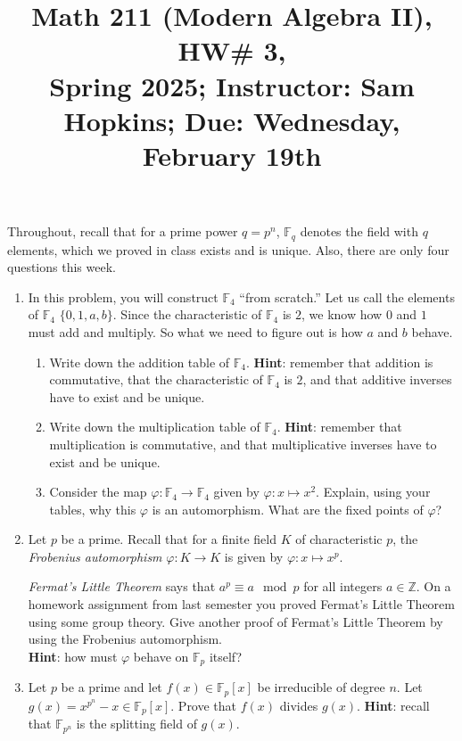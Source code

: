 \documentclass[11pt]{article}
\title{Math 211 (Modern Algebra II), HW\# 3, \\ {\normalsize Spring 2025; Instructor: Sam Hopkins; Due: Wednesday, February 19th}}
\date{}
\begin{document}
\maketitle

\thispagestyle{empty}

Throughout, recall that for a prime power $q=p^n$, $\mathbb{F}_q$ denotes the field with $q$ elements, which we proved in class exists and is unique. Also, there are only four questions this week.

\begin{enumerate}

\item In this problem, you will construct $\mathbb{F}_4$ ``from scratch.'' Let us call the elements of $\mathbb{F}_4$ $\{0,1,a,b\}$. Since the characteristic of $\mathbb{F}_4$ is $2$, we know how $0$ and $1$ must add and multiply. So what we need to figure out is how $a$ and $b$ behave.
\begin{enumerate}
\item Write down the addition table of $\mathbb{F}_4$. {\bf Hint}: remember that addition is commutative, that the characteristic of $\mathbb{F}_4$ is $2$, and that additive inverses have to exist and be unique.
\item Write down the multiplication table of $\mathbb{F}_4$. {\bf Hint}: remember that multiplication is commutative, and that multiplicative inverses have to exist and be unique.
\item Consider the map $\varphi\colon \mathbb{F}_4 \to \mathbb{F}_4$ given by $\varphi\colon x \mapsto x^2$. Explain, using your tables, why this $\varphi$ is an automorphism. What are the fixed points of $\varphi$?
\end{enumerate}

\item Let $p$ be a prime. Recall that for a finite field $K$ of characteristic $p$, the \emph{Frobenius automorphism} $\varphi\colon K \to K$ is given by $\varphi\colon x \mapsto x^p$.

\emph{Fermat's Little Theorem} says that $a^p \equiv a \mod p$ for all integers $a\in\mathbb{Z}$. On a homework assignment from last semester you proved Fermat's Little Theorem using some group theory. Give another proof of Fermat's Little Theorem by using the Frobenius automorphism. \\{\bf Hint}: how must $\varphi$ behave on $\mathbb{F}_p$ itself?

\item Let $p$ be a prime and let $f(x) \in \mathbb{F}_p[x]$ be irreducible of degree $n$. Let $g(x) = x^{p^n}-x\in \mathbb{F}_p[x]$. Prove that $f(x)$ divides $g(x)$. {\bf Hint}: recall that $\mathbb{F}_{p^n}$ is the splitting field of $g(x)$.


\end{enumerate}
\end{document}
